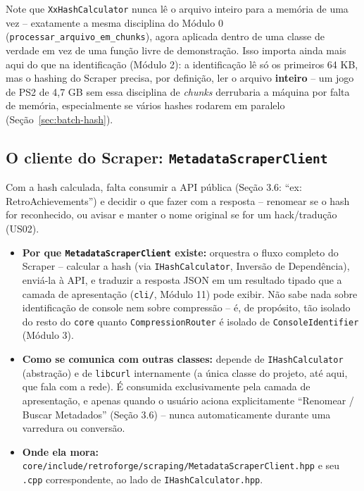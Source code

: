 \begin{CaixaAlerta}
Note que \texttt{XxHashCalculator} nunca lê o arquivo inteiro para a memória de uma vez -- exatamente a mesma disciplina do Módulo 0 (\texttt{processar\_arquivo\_em\_chunks}), agora aplicada dentro de uma classe de verdade em vez de uma função livre de demonstração. Isso importa ainda mais aqui do que na identificação (Módulo 2): a identificação lê só os primeiros 64 KB, mas o hashing do Scraper precisa, por definição, ler o arquivo \textbf{inteiro} -- um jogo de PS2 de 4,7 GB sem essa disciplina de \textit{chunks} derrubaria a máquina por falta de memória, especialmente se vários hashes rodarem em paralelo (Seção~\ref{sec:batch-hash}).
\end{CaixaAlerta}

\subsection{O cliente do Scraper: \texttt{MetadataScraperClient}}

Com a hash calculada, falta consumir a API pública (Seção 3.6: ``ex: RetroAchievements'') e decidir o que fazer com a resposta -- renomear se o hash for reconhecido, ou avisar e manter o nome original se for um hack/tradução (US02).

\begin{itemize}
    \item \textbf{Por que \texttt{MetadataScraperClient} existe:} orquestra o fluxo completo do Scraper -- calcular a hash (via \texttt{IHashCalculator}, Inversão de Dependência), enviá-la à API, e traduzir a resposta JSON em um resultado tipado que a camada de apresentação (\texttt{cli/}, Módulo 11) pode exibir. Não sabe nada sobre identificação de console nem sobre compressão -- é, de propósito, tão isolado do resto do \texttt{core} quanto \texttt{CompressionRouter} é isolado de \texttt{ConsoleIdentifier} (Módulo 3).
    \item \textbf{Como se comunica com outras classes:} depende de \texttt{IHashCalculator} (abstração) e de \texttt{libcurl} internamente (a única classe do projeto, até aqui, que fala com a rede). É consumida exclusivamente pela camada de apresentação, e apenas quando o usuário aciona explicitamente ``Renomear / Buscar Metadados'' (Seção 3.6) -- nunca automaticamente durante uma varredura ou conversão.
    \item \textbf{Onde ela mora:} \texttt{core/include/retroforge/scraping/MetadataScraperClient.hpp} e seu \texttt{.cpp} correspondente, ao lado de \texttt{IHashCalculator.hpp}.
\end{itemize}

